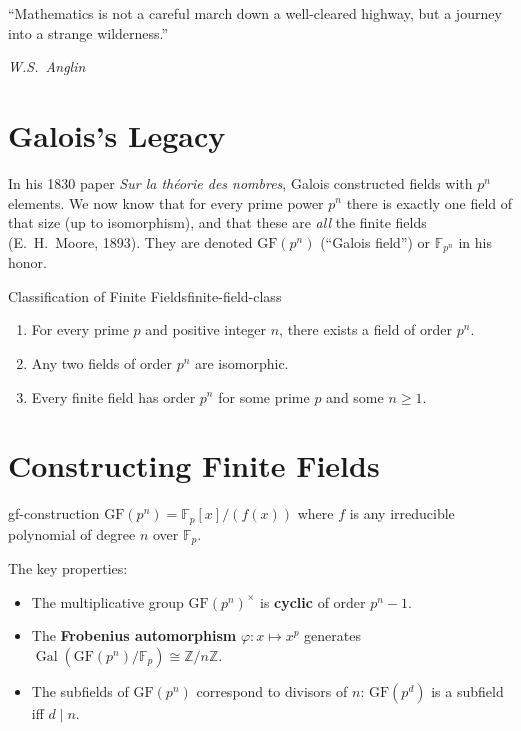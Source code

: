 \documentclass[11pt, a4paper, oneside]{book}
\newcommand{\Z}{\mathbb{Z}}
\newcommand{\F}{\mathbb{F}}
\newcommand{\GF}{\mathrm{GF}}
\newcommand{\Gal}{\operatorname{Gal}}
\newcommand{\iso}{\cong}
\begin{document}
\epigraph{``Mathematics is not a careful march down a well-cleared highway, but
a journey into a strange wilderness.''}{\textit{W.S.\ Anglin}}

\section{Galois's Legacy}

\begin{historical}[title={The Fields That Bear His Name}]
In his 1830 paper \textit{Sur la théorie des nombres}, Galois constructed
fields with $p^n$ elements. We now know that for every prime power $p^n$ there
is exactly one field of that size (up to isomorphism), and that these are
\emph{all} the finite fields (E.~H.~Moore, 1893). They are denoted $\GF(p^n)$ (``Galois
field'') or $\F_{p^n}$ in his honor.
\end{historical}

\begin{thm}{Classification of Finite Fields}{finite-field-class}
\begin{enumerate}[nosep, label=(\roman*)]
\item For every prime $p$ and positive integer $n$, there exists a field of
  order $p^n$.
\item Any two fields of order $p^n$ are isomorphic.
\item Every finite field has order $p^n$ for some prime $p$ and some $n \geq 1$.
\end{enumerate}
\end{thm}

\section{Constructing Finite Fields}

\begin{defn}{}{gf-construction}
$\GF(p^n) = \F_p[x]/(f(x))$ where $f$ is any irreducible polynomial of degree
$n$ over $\F_p$.
\end{defn}

The key properties:
\begin{itemize}[nosep]
\item The multiplicative group $\GF(p^n)^\times$ is \textbf{cyclic} of order $p^n - 1$.
\item The \textbf{Frobenius automorphism} $\varphi : x \mapsto x^p$ generates
  $\Gal(\GF(p^n)/\F_p) \iso \Z/n\Z$.
\item The subfields of $\GF(p^n)$ correspond to divisors of $n$:
  $\GF(p^d)$ is a subfield iff $d \mid n$.
\end{itemize}
\end{document}
